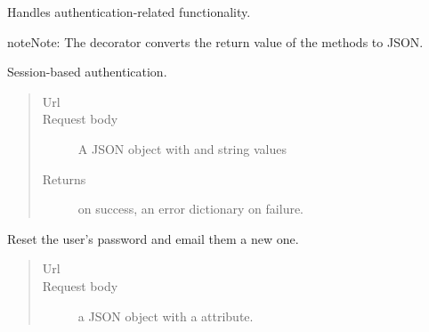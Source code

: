 \documentclass[letterpaper,10pt,english]{sphinxmanual}
\begin{document}
\begin{fulllineitems}
\label{api:onlinelinguisticdatabase.controllers.login.LoginController}
Handles authentication-related functionality.

\begin{notice}{note}{Note:}
The  decorator converts the return value of the methods to
JSON.
\end{notice}

\begin{fulllineitems}
\label{api:onlinelinguisticdatabase.controllers.login.LoginController.authenticate}
Session-based authentication.
\begin{quote}\begin{description}
\item[{Url }] \leavevmode
{}

\item[{Request body}] \leavevmode
A JSON object with  and 
string values

\item[{Returns}] \leavevmode
{} on success, an error dictionary on
failure.

\end{description}\end{quote}

\end{fulllineitems}


\begin{fulllineitems}
\label{api:onlinelinguisticdatabase.controllers.login.LoginController.email_reset_password}
Reset the user's password and email them a new one.
\begin{quote}\begin{description}
\item[{Url }] \leavevmode
{}

\item[{Request body}] \leavevmode
a JSON object with a  attribute.


\end{description}
\end{quote}
\end{fulllineitems}
\end{fulllineitems}
\end{document}
